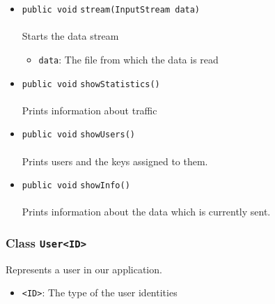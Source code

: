 \begin{itemize}
\item \lstinline|public void| \lstinline|stream|\lstinline|(InputStream data)|\\ \\[-0.6em]
Starts the data stream
\begin{itemize}
\item \lstinline|data|: The file from which the data is read
\end{itemize}



\item \lstinline|public void| \lstinline|showStatistics|\lstinline|()|\\ \\[-0.6em]
Prints information about traffic



\item \lstinline|public void| \lstinline|showUsers|\lstinline|()|\\ \\[-0.6em]
Prints users and the keys assigned to them.



\item \lstinline|public void| \lstinline|showInfo|\lstinline|()|\\ \\[-0.6em]
Prints information about the data which is currently sent.



\end{itemize}

\subsubsection{Class \lstinline|User<ID>|}
Represents a user in our application. \\
\noindent\begin{minipage}[t]{5cm}
\vspace{0.3em}
\hspace*{2em}
\vspace{0.3em}
\end{minipage}

\begin{itemize}
\item \lstinline|<ID>|: The type of the user identities
\end{itemize}



